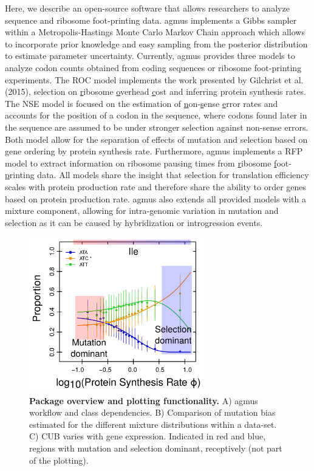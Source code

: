 \documentclass{bioinfo}
\newcommand{\package}{agmus } %
\begin{document}
Here, we describe an open-source software that allows researchers to analyze sequence and ribosome foot-printing data. 
\package implements a Gibbs sampler within a Metropolis-Hastings Monte Carlo Markov Chain approach which allows to incorporate prior knowledge and easy sampling from the posterior distribution to estimate parameter uncertainty. 
Currently, \package provides three models to analyze codon counts obtained from coding sequences or ribosome foot-printing experiments. 
The ROC model implements the work presented by Gilchrist et al. (2015), selection on \underline{r}ibosome \underline{o}verhead \underline{c}ost and inferring protein synthesis rates.
The NSE model is focused on the estimation of \underline{n}on-\underline{s}ense \underline{e}rror rates and accounts for the position of a codon in the sequence, where codons found later in the sequence are assumed to be under stronger selection against non-sense errors.
Both model allow for the separation of effects of mutation and selection based on gene ordering by protein synthesis rate.
Furthermore, \package implements a RFP model to extract information on ribosome pausing times from \underline{r}ibosome \underline{f}oot-\underline{p}rinting data. 
All models share the insight that selection for translation efficiency scales with protein production rate and therefore share the ability to order genes based on protein production rate. 
\package also extends all provided models with a mixture component, allowing for intra-genomic variation in mutation and selection as it can be caused by hybridization or introgression events.

\begin{figure}[!tpb]
\centering
 \includegraphics[width=3in]{expl_model.png}
\vspace{-0.2cm}
\caption{\textbf{Package overview and plotting functionality.} A) \package workflow and class dependencies. B) Comparison of mutation bias estimated for the different mixture distributions within a data-set. C) CUB varies with gene expression. Indicated in red and blue, regions with mutation and selection dominant, receptively (not part of the plotting). 
}
\label{fig:plotbin}
\end{figure}
\end{document}
